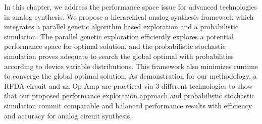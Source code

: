     In this chapter, we address the performance space issue for advanced technologies in analog synthesis. We propose a hierarchical analog synthesis framework which integrates a parallel genetic algorithm based exploration and a probabilistic simulation. The parallel genetic exploration efficiently explores a potential performance space for optimal solution, and the probabilistic stochastic simulation proves adequate to search the global optimal with probabilities according to device variable distributions. This framework also minimizes runtime to converge the global optimal solution. As demonstration for our methodology, a RFDA circuit and an Op-Amp are practiced via 3 different technologies to show that our proposed performance exploration approach and probabilistic stochastic simulation commit comparable and balanced performance results with efficiency and accuracy for analog circuit synthesis.